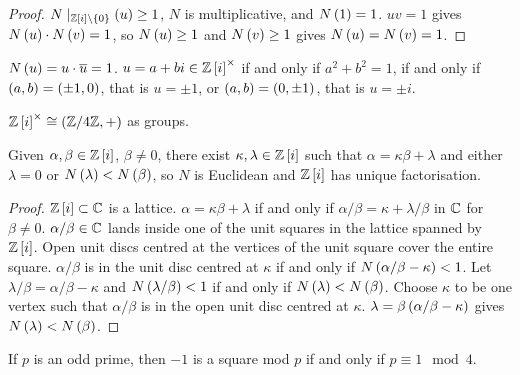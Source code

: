 \begin{proof}
$ N \mid_{\mathbb{Z}\left[ i \right] \setminus \left\{ 0 \right\}}\left( u \right) \ge 1 $, $ N $ is multiplicative, and $ N\left( 1 \right) = 1 $. $ uv = 1 $ gives $ N\left( u \right) \cdot N\left( v \right) = 1 $, so $ N\left( u \right) \ge 1 $ and $ N\left( v \right) \ge 1 $ gives $ N\left( u \right) = N\left( v \right) = 1 $.
\end{proof}

$ N\left( u \right) = u \cdot \overline{u} = 1 $. $ u = a + bi \in \mathbb{Z}\left[ i \right]^\times $ if and only if $ a^2 + b^2 = 1 $, if and only if $ \left( a, b \right) = \left( \pm 1, 0 \right) $, that is $ u = \pm 1 $, or $ \left( a, b \right) = \left( 0, \pm 1 \right) $, that is $ u = \pm i $.

\begin{remark*}
$ \mathbb{Z}\left[ i \right]^\times \cong \left( \mathbb{Z} / 4\mathbb{Z}, + \right) $ as groups.
\end{remark*}

\begin{proposition}
Given $ \alpha, \beta \in \mathbb{Z}\left[ i \right] $, $ \beta \ne 0 $, there exist $ \kappa, \lambda \in \mathbb{Z}\left[ i \right] $ such that $ \alpha = \kappa\beta + \lambda $ and either $ \lambda = 0 $ or $ N\left( \lambda \right) < N\left( \beta \right) $, so $ N $ is Euclidean and $ \mathbb{Z}\left[ i \right] $ has unique factorisation.
\end{proposition}

\begin{proof}
$ \mathbb{Z}\left[ i \right] \subset \mathbb{C} $ is a lattice. $ \alpha = \kappa\beta + \lambda $ if and only if $ \alpha / \beta = \kappa + \lambda / \beta $ in $ \mathbb{C} $ for $ \beta \ne 0 $. $ \alpha / \beta \in \mathbb{C} $ lands inside one of the unit squares in the lattice spanned by $ \mathbb{Z}\left[ i \right] $. Open unit discs centred at the vertices of the unit square cover the entire square. $ \alpha / \beta $ is in the unit disc centred at $ \kappa $ if and only if $ N\left( \alpha / \beta - \kappa \right) < 1 $. Let $ \lambda / \beta = \alpha / \beta - \kappa $ and $ N\left( \lambda / \beta \right) < 1 $ if and only if $ N\left( \lambda \right) < N\left( \beta \right) $. Choose $ \kappa $ to be one vertex such that $ \alpha / \beta $ is in the open unit disc centred at $ \kappa $. $ \lambda = \beta\left( \alpha / \beta - \kappa \right) $ gives $ N\left( \lambda \right) < N\left( \beta \right) $.
\end{proof}

\begin{lemma}
If $ p $ is an odd prime, then $ -1 $ is a square mod $ p $ if and only if $ p \equiv 1 \mod 4 $.
\end{lemma}

